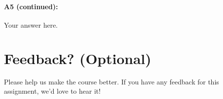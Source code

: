 \pagebreak
\paragraph{A5 (continued):} Your answer here.







\pagebreak
\section*{Feedback? (Optional)}
Please help us make the course better. If you have any feedback for this assignment, we'd love to hear it!




